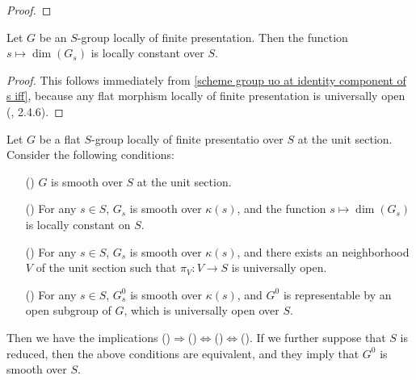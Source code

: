 \begin{proof}
\end{proof}

\begin{corollary}\label{scheme group local fp fiber dimension is locally constant}
Let $G$ be an $S$-group locally of finite presentation. Then the function $s\mapsto\dim(G_s)$ is locally constant over $S$.
\end{corollary}
\begin{proof}
This follows immediately from \cref{scheme group uo at identity component of s iff}, because any flat morphism locally of finite presentation is universally open (\cite{EGA4-2}, 2.4.6).
\end{proof}

\begin{corollary}\label{scheme group flat local ft smooth at unit section iff}
Let $G$ be a flat $S$-group locally of finite presentatio over $S$ at the unit section. Consider the following conditions:
\begin{enumerate}
    \item[(\rmnum{1})] $G$ is smooth over $S$ at the unit section.
    \item[(\rmnum{2})] For any $s\in S$, $G_s$ is smooth over $\kappa(s)$, and the function $s\mapsto\dim(G_s)$ is locally constant on $S$.
    \item[(\rmnum{3})] For any $s\in S$, $G_s$ is smooth over $\kappa(s)$, and there exists an neighborhood $V$ of the unit section such that $\pi_V:V\to S$ is universally open.
    \item[(\rmnum{4})] For any $s\in S$, $G_s^0$ is smooth over $\kappa(s)$, and $G^0$ is representable by an open subgroup of $G$, which is universally open over $S$.
\end{enumerate} 
Then we have the implications ()$\Rightarrow$()$\Leftrightarrow$()$\Leftrightarrow$(). If we further suppose that $S$ is reduced, then the above conditions are equivalent, and they imply that $G^0$ is smooth over $S$.
\end{corollary}
